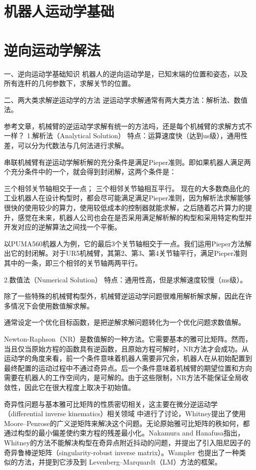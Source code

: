 \chapter{机器人运动学基础}
\chapter{逆向运动学解法}
一、逆向运动学基础知识
机器人的逆向运动学是，已知末端的位置和姿态，以及所有连杆的几何参数下，求解关节的位置。



二、两大类求解逆运动学的方法
逆运动学求解通常有两大类方法：解析法、数值法。

参考文章，机械臂的逆运动学求解有统一的方法吗，还是每个机械臂的求解方式不一样？
1.解析法（Analytical Solution）
特点：运算速度快（达到us级），通用性差，可以分为代数法与几何法进行求解。

串联机械臂有逆运动学解析解的充分条件是满足Pieper准则。即如果机器人满足两个充分条件中的一个，就会得到封闭解，这两个条件是：

三个相邻关节轴相交于一点；
三个相邻关节轴相互平行。
现在的大多数商品化的工业机器人在设计构型时，都会尽可能满足满足Pieper准则，因为解析法求解能够很快的使用较少的算力，使用较低成本的控制器就能求解，之后随着芯片算力的提升，感觉在未来，机器人公司也会在是否采用满足解析解的构型和采用特定构型并开发对应的逆解算法之间找一个平衡。

以PUMA560机器人为例，它的最后3个关节轴相交于一点。我们运用Pieper方法解出它的封闭解。对于UR5机械臂，其第2、第3、第4关节轴平行，满足Pieper准则其中的一条，即三个相邻的关节轴两两平行。



2.数值法（Numerical Solution）
特点：通用性高，但是求解速度较慢（ms级）。

除了一些特殊的机械臂构型外，机械臂逆运动学问题很难用解析解求解，因此在许多情况下会使用数值解求解。

通常设定一个优化目标函数，是把逆解求解问题转化为一个优化问题求数值解。

Newton-Raphson（NR）是数值解的一种方法。它需要基本的雅可比矩阵。然而，当且仅当原始方程的函数具有逆函数，且原始方程可解时，NR方法才会成功。从运动学的角度来看，前一个条件意味着机器人需要非冗余，机器人在从初始配置到最终配置的运动过程中不通过奇异点。后一个条件意味着机械臂的期望位置和方向需要在机器人的工作空间内，是可解的。由于这些限制，NR方法不能保证全局收敛性，因此它在很大程度上取决于初始值。

奇异性问题与基本雅可比矩阵的性质密切相关，这主要在微分逆运动学（differential inverse kinematics）相关领域 中进行了讨论，Whitney提出了使用Moore–Penrose的广义逆矩阵来解决这个问题。无论原始雅可比矩阵的秩如何，都通过构型的最小偏差使约束方程的残差最小化。Nakamura and Hanafusa指出，Whitney的方法不能解决构型在奇异点附近抖动的问题，并提出了引入阻尼因子的奇异鲁棒逆矩阵（singularity-robust inverse matrix）。Wampler 也提出了一种类似的方法，并提到它涉及到 Levenberg–Marquardt（LM）方法的框架。

